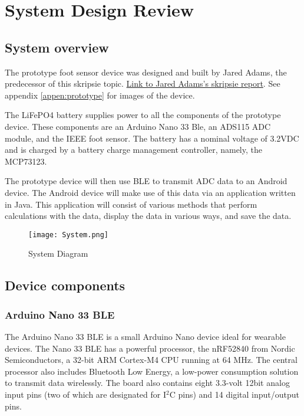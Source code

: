 \graphicspath{{systemdesign/fig/}}
\chapter{System Design Review}
\label{chap:systemdesign}

\section{System overview}

The prototype foot sensor device was designed and built by Jared Adams, the predecessor of this skripsie topic. \href{https://drive.google.com/file/d/1Jbl6vRFZgYbqtvDGFZ4_XmvcbU_vJX-k/view?usp=sharing}{Link to Jared Adams's skripsie report}. See appendix \ref{appen:prototype} for images of the device.

The LiFePO4 battery supplies power to all the components of the prototype device. These components are an Arduino Nano 33 Ble, an ADS115 ADC module, and the IEEE foot sensor. The battery has a nominal voltage of 3.2VDC and is charged by a battery charge management controller, namely, the MCP73123.

The prototype device will then use BLE to transmit ADC data to an Android device. The Android device will make use of this data via an application written in Java. This application will consist of various methods that perform calculations with the data, display the data in various ways, and save the data.


\begin{figure}[!h]
    \centering
    \texttt{[image: System.png]}
    \caption{System Diagram}
    \label{fig:sysdiagram}
\end{figure}
\section{Device components}

\subsection{Arduino Nano 33 BLE}
The Arduino Nano 33 BLE is a small Arduino Nano device ideal for wearable devices. The Nano 33 BLE has a powerful processor, the nRF52840 from Nordic Semiconductors, a 32-bit ARM Cortex-M4 CPU running at 64 MHz. The central processor also includes Bluetooth Low Energy, a low-power consumption solution to transmit data wirelessly. The board also contains eight 3.3-volt 12bit analog input pins (two of which are designated for I$^2$C pins) and 14 digital input/output pins. 

